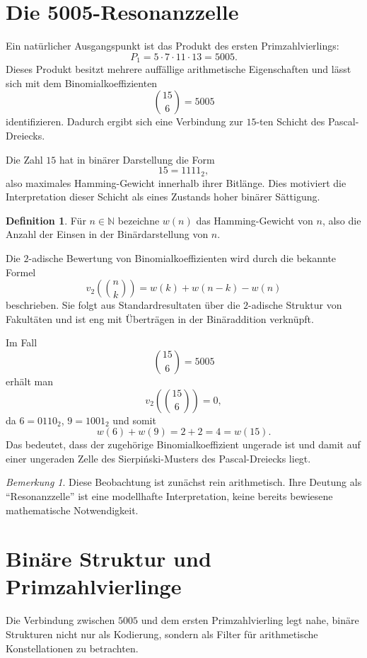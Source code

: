 \documentclass[11pt,a4paper,twocolumn]{article}
\theoremstyle{definition}
\newtheorem{definition}{Definition}
\theoremstyle{remark}
\newtheorem{bemerkung}{Bemerkung}
\begin{document}
	\section{Die 5005-Resonanzzelle}
	Ein natürlicher Ausgangspunkt ist das Produkt des ersten Primzahlvierlings:
	\[
	P_1 = 5\cdot 7\cdot 11\cdot 13 = 5005.
	\]
	Dieses Produkt besitzt mehrere auffällige arithmetische Eigenschaften und lässt sich mit dem Binomialkoeffizienten
	\[
	\binom{15}{6}=5005
	\]
	identifizieren. Dadurch ergibt sich eine Verbindung zur $15$-ten Schicht des Pascal-Dreiecks.
	
	Die Zahl $15$ hat in binärer Darstellung die Form
	\[
	15=1111_2,
	\]
	also maximales Hamming-Gewicht innerhalb ihrer Bitlänge. Dies motiviert die Interpretation dieser Schicht als eines Zustands hoher binärer Sättigung.
	
	\begin{definition}
		Für $n\in \mathbb{N}$ bezeichne $w(n)$ das Hamming-Gewicht von $n$, also die Anzahl der Einsen in der Binärdarstellung von $n$.
	\end{definition}
	
	Die $2$-adische Bewertung von Binomialkoeffizienten wird durch die bekannte Formel
	\begin{equation}
		v_2\!\left(\binom{n}{k}\right)=w(k)+w(n-k)-w(n)
	\end{equation}
	beschrieben. Sie folgt aus Standardresultaten über die $2$-adische Struktur von Fakultäten und ist eng mit Überträgen in der Binäraddition verknüpft.
	
	Im Fall
	\[
	\binom{15}{6}=5005
	\]
	erhält man
	\[
	v_2\!\left(\binom{15}{6}\right)=0,
	\]
	da $6=0110_2$, $9=1001_2$ und somit
	\[
	w(6)+w(9)=2+2=4=w(15).
	\]
	Das bedeutet, dass der zugehörige Binomialkoeffizient ungerade ist und damit auf einer ungeraden Zelle des Sierpiński-Musters des Pascal-Dreiecks liegt.
	
	\begin{bemerkung}
		Diese Beobachtung ist zunächst rein arithmetisch. Ihre Deutung als ``Resonanzzelle'' ist eine modellhafte Interpretation, keine bereits bewiesene mathematische Notwendigkeit.
	\end{bemerkung}
	
	\section{Binäre Struktur und Primzahlvierlinge}
	Die Verbindung zwischen $5005$ und dem ersten Primzahlvierling legt nahe, binäre Strukturen nicht nur als Kodierung, sondern als Filter für arithmetische Konstellationen zu betrachten.
	
\end{document}
